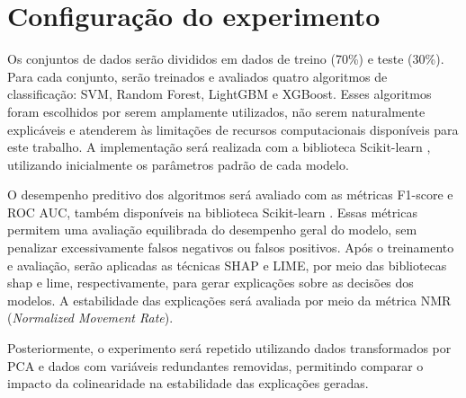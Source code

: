 \section{Configuração do experimento}\label{sec:cofiguracao_experimentos}
Os conjuntos de dados serão divididos em dados de treino (70\%) e teste (30\%). Para cada conjunto, serão treinados e avaliados quatro algoritmos de classificação: SVM, Random Forest, LightGBM e XGBoost. Esses algoritmos foram escolhidos por serem amplamente utilizados, não serem naturalmente explicáveis e atenderem às limitações de recursos computacionais disponíveis para este trabalho. A implementação será realizada com a biblioteca Scikit-learn \cite{scikit-learn}, utilizando inicialmente os parâmetros padrão de cada modelo.

O desempenho preditivo dos algoritmos será avaliado com as métricas F1-score e ROC AUC, também disponíveis na biblioteca Scikit-learn \cite{scikit-learn}. Essas métricas permitem uma avaliação equilibrada do desempenho geral do modelo, sem penalizar excessivamente falsos negativos ou falsos positivos. Após o treinamento e avaliação, serão aplicadas as técnicas SHAP e LIME, por meio das bibliotecas shap e lime, respectivamente, para gerar explicações sobre as decisões dos modelos. A estabilidade das explicações será avaliada por meio da métrica NMR (\textit{Normalized Movement Rate}).

Posteriormente, o experimento será repetido utilizando dados transformados por PCA e dados com variáveis redundantes removidas, permitindo comparar o impacto da colinearidade na estabilidade das explicações geradas.





